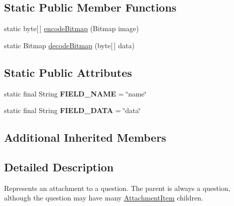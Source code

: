 \subsection*{Static Public Member Functions}
\begin{DoxyCompactItemize}
\item 
static byte\mbox{[}$\,$\mbox{]} \hyperlink{classcom_1_1ualberta_1_1team17_1_1_attachment_item_a84b3922d4bdaf53008adbff338cd8dc9}{encode\+Bitmap} (Bitmap image)
\item 
static Bitmap \hyperlink{classcom_1_1ualberta_1_1team17_1_1_attachment_item_a4d4ff030ffe0d774348aa74fc60eefc1}{decode\+Bitmap} (byte\mbox{[}$\,$\mbox{]} data)
\end{DoxyCompactItemize}
\subsection*{Static Public Attributes}
\begin{DoxyCompactItemize}
\item 
\hypertarget{classcom_1_1ualberta_1_1team17_1_1_attachment_item_a60c36781f1a3bbc6bb4ed4f364fbfa35}{static final String {\bfseries F\+I\+E\+L\+D\+\_\+\+N\+A\+M\+E} = \char`\"{}name\char`\"{}}\label{classcom_1_1ualberta_1_1team17_1_1_attachment_item_a60c36781f1a3bbc6bb4ed4f364fbfa35}

\item 
\hypertarget{classcom_1_1ualberta_1_1team17_1_1_attachment_item_a8de1dea79f5d16531fc5de1857c6ab61}{static final String {\bfseries F\+I\+E\+L\+D\+\_\+\+D\+A\+T\+A} = \char`\"{}data\char`\"{}}\label{classcom_1_1ualberta_1_1team17_1_1_attachment_item_a8de1dea79f5d16531fc5de1857c6ab61}

\end{DoxyCompactItemize}
\subsection*{Additional Inherited Members}


\subsection{Detailed Description}
Represents an attachment to a question. The parent is always a question, although the question may have many \hyperlink{classcom_1_1ualberta_1_1team17_1_1_attachment_item}{Attachment\+Item} children. 

